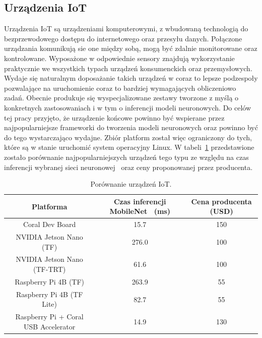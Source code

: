 \subsection{Urządzenia IoT}

Urządzenia IoT są urządzeniami komputerowymi, z wbudowaną technologią do
bezprzewodowego dostępu do internetowego oraz przesyłu danych. Połączone urządzania komunikują
sie one między sobą, mogą być zdalnie monitorowane oraz kontrolowane. Wyposażone w odpowiednie
sensory znajdują wykorzystanie praktycznie we wszystkich typach urządzeń konsumenckich oraz
przemysłowych. Wydaje się naturalnym doposażanie takich urządzeń w coraz to lepsze podzespoły
pozwalające na uruchomienie coraz to bardziej wymagających obliczeniowo zadań. Obecnie produkuje się
wyspecjalizowane zestawy tworzone z myślą o konkretnych zastosowaniach i w tym o inferencji
modeli neuronowych. Do celów tej pracy przyjęto, że urządzenie końcowe powinno być wspierane
przez najpopularniejsze frameworki do tworzenia modeli neuronowych oraz powinno być do tego
wystarczająco wydajne. Zbiór platform został więc ograniczony do tych, które są w stanie
uruchomić system operacyjny Linux. W tabeli~\ref{table:device_comp} przedstawione zostało
porównanie najpopularniejszych urządzeń tego typu ze względu na czas inferencji wybranej sieci
neuronowej~\cite{BoardBenchmark} oraz ceny proponowanej przez producenta.

\begin{table}[h]
    \begin{tabular}{ccc}
   Platforma                            & Czas inferencji MobileNet~\cite{MobileNet} (ms) & Cena producenta (USD) \\[0.5ex] 
    \hline\hline
    Coral Dev Board                      & \num{15.7}           & \num{150}                  \\
    \hline
    NVIDIA Jetson Nano (TF)              & \num{276.0}          & \num{100}                  \\
    NVIDIA Jetson Nano (TF-TRT)          & \num{61.6}           & \num{100}                  \\
    \hline
    Raspberry Pi 4B (TF)                 & \num{263.9}          & \num{55}                   \\
    Raspberry Pi 4B (TF Lite)            & \num{82.7}           & \num{55}                   \\
    \hline
    Raspberry Pi + Coral USB Accelerator & \num{14.9}           & \num{130}                 
    \end{tabular}
    \caption{Porównanie urządzeń IoT.}
    \label{table:device_comp}
\end{table}


